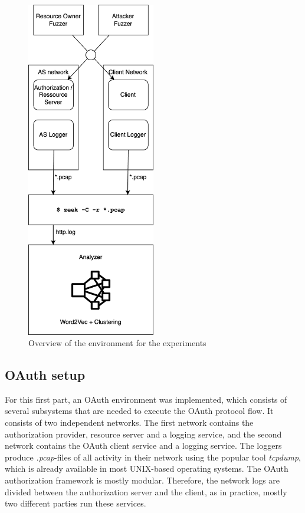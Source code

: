 \begin{figure}[H]
	\sffamily\footnotesize
	\includegraphics[width=0.5\textwidth]{pic/experimental_setup.png}
	\unitlength=0.75mm
	\linethickness{0.4pt}
	\caption{Overview of the environment for the experiments}
	\label{fig:experimental_setup}
\end{figure}

\subsection{OAuth setup}
For this first part, an OAuth environment was implemented, which consists of several subsystems that are needed to execute the OAuth protocol flow. It consists of two independent networks. The first network contains the authorization provider, resource server and a logging service, and the second network contains the OAuth client service and a logging service. The loggers produce \emph{.pcap}-files of all activity in their network using the popular tool \emph{tcpdump}, which is already available in most UNIX-based operating systems. The OAuth authorization framework is mostly modular. Therefore, the network logs are divided between the authorization server and the client, as in practice, mostly two different parties run these services. 


